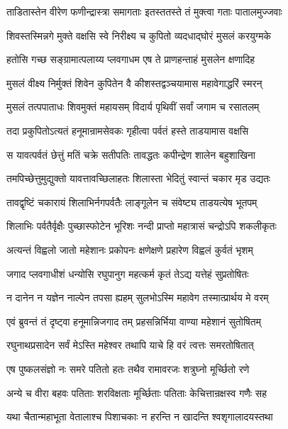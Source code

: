 \twolineshloka
{ताडितास्तेन वीरेण फणीन्द्रास्त्रा समागताः}
{इतस्ततस्ते तं मुक्त्वा गताः पातालमुज्जवाः}%

\twolineshloka
{शिवस्तस्मिन्नगे मुक्ते वक्षसि स्वे निरीक्ष्य च}
{कुपितो व्यदधाद्घोरं मुसलं करयुग्मके}%

\twolineshloka
{हतोसि गच्छ सङ्ग्रामात्पलाय्य प्लवगाधम}
{एष ते प्राणहन्ताहं मुसलेन क्षणादिह}%

\twolineshloka
{मुसलं वीक्ष्य निर्मुक्तं शिवेन कुपितेन वै}
{कीशस्तद्वञ्चयामास महावेगाद्धरिं स्मरन्}%

\twolineshloka
{मुसलं तत्पपाताधः शिवमुक्तं महायसम्}
{विदार्य पृथिवीं सर्वां जगाम च रसातलम्}%

\twolineshloka
{तदा प्रकुपितोऽत्यतं हनूमान्रामसेवकः}
{गृहीत्वा पर्वतं हस्ते ताडयामास वक्षसि}%

\twolineshloka
{स यावत्पर्वतं छेत्तुं मतिं चक्रे सतीपतिः}
{तावद्धतः कपीन्द्रेण शालेन बहुशाखिना}%

\twolineshloka
{तमपिच्छेत्तुमुद्युक्तो यावत्तावच्छिलाहतः}
{शिलास्ता भेदितुं स्वान्तं चकार मृड उद्यतः}%

\twolineshloka
{तावद्वृष्टिं चकारायं शिलाभिर्नगपर्वतैः}
{लाङ्गूलेन च संवेष्ट्य ताडयत्येष भूतपम्}%

\twolineshloka
{शिलाभिः पर्वतैर्वृक्षैः पुच्छास्फोटेन भूरिशः}
{नन्दी प्राप्तो महात्रासं चन्द्रोऽपि शकलीकृतः}%

\twolineshloka
{अत्यन्तं विह्वलो जातो महेशानः प्रकोपनः}
{क्षणेक्षणे प्रहारेण विह्वलं कुर्वतं भृशम्}%

\twolineshloka
{जगाद प्लवगाधीशं धन्योसि रघुपानुग}
{महत्कर्म कृतं तेऽद्य यत्तेहं सुप्रतोषितः}%

\twolineshloka
{न दानेन न यज्ञेन नाल्पेन तपसा ह्यहम्}
{सुलभोऽस्मि महावेग तस्मात्प्रार्थय मे वरम्}%


\twolineshloka
{एवं ब्रुवन्तं तं दृष्ट्वा हनूमान्निजगाद तम्}
{प्रहसन्निर्भिया वाण्या महेशानं सुतोषितम्}%


\twolineshloka
{रघुनाथप्रसादेन सर्वं मेऽस्ति महेश्वर}
{तथापि याचे हि वरं त्वत्तः समरतोषितात्}%

\twolineshloka
{एष पुष्कलसंज्ञो नः समरे पतितो हतः}
{तथैव रामावरजः शत्रुघ्नो मूर्च्छितो रणे}%

\twolineshloka
{अन्ये च वीरा बहवः पतिताः शरविक्षताः}
{मूर्च्छिताः पतिताः केचित्तान्रक्षस्व गणैः सह}%

\twolineshloka
{यथा चैतान्महाभूता वेतालाश्च पिशाचकाः}
{न हरन्ति न खादन्ति श्वशृगालादयस्तथा}%

